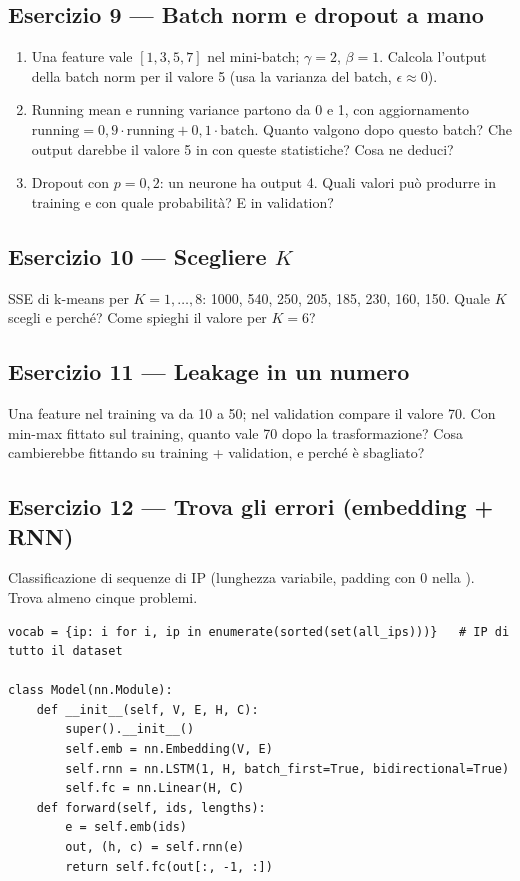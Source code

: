 \subsection*{Esercizio 9 --- Batch norm e dropout a mano}\label{es:e9}
\begin{enumerate}[label=(\alph*)]
  \item Una feature vale $[1, 3, 5, 7]$ nel mini-batch; $\gamma = 2$, $\beta = 1$. Calcola l'output della batch norm per il valore 5
        (usa la varianza del batch, $\epsilon \approx 0$).
  \item Running mean e running variance partono da 0 e 1, con aggiornamento $\text{running} = 0{,}9\cdot\text{running} + 0{,}1\cdot\text{batch}$.
        Quanto valgono dopo questo batch? Che output darebbe il valore 5 in  con queste statistiche? Cosa ne deduci?
  \item Dropout con $p = 0{,}2$: un neurone ha output 4. Quali valori può produrre in training e con quale probabilità? E in validation?
\end{enumerate}

\subsection*{Esercizio 10 --- Scegliere $K$}\label{es:e10}
SSE di k-means per $K = 1,\ldots,8$: 1000, 540, 250, 205, 185, 230, 160, 150. Quale $K$ scegli e perché? Come spieghi il valore per
$K=6$?

\subsection*{Esercizio 11 --- Leakage in un numero}\label{es:e11}
Una feature nel training va da 10 a 50; nel validation compare il valore 70. Con min-max fittato sul training, quanto vale 70 dopo la
trasformazione? Cosa cambierebbe fittando su training + validation, e perché è sbagliato?

\subsection*{Esercizio 12 --- Trova gli errori (embedding + RNN)}\label{es:e12}
Classificazione di sequenze di IP (lunghezza variabile, padding con 0 nella ). Trova almeno cinque problemi.
\begin{lstlisting}
vocab = {ip: i for i, ip in enumerate(sorted(set(all_ips)))}   # IP di tutto il dataset

class Model(nn.Module):
    def __init__(self, V, E, H, C):
        super().__init__()
        self.emb = nn.Embedding(V, E)
        self.rnn = nn.LSTM(1, H, batch_first=True, bidirectional=True)
        self.fc = nn.Linear(H, C)
    def forward(self, ids, lengths):
        e = self.emb(ids)
        out, (h, c) = self.rnn(e)
        return self.fc(out[:, -1, :])
\end{lstlisting}

